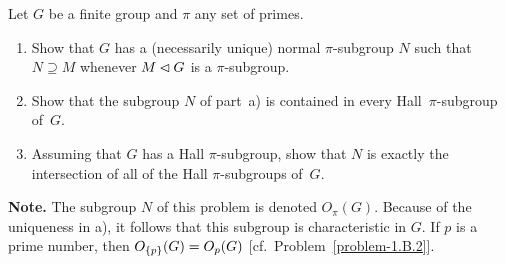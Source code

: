 \begin{probl}\label{problem-1.D.7} Let $G$ be a finite group and $\pi$ any set of primes.
    \begin{enumerate}[\rm a)]
    \item Show that $G$ has a (necessarily unique) normal\/ $\pi$-subgroup\/ $N$ such that $N \supseteq M$ whenever $M\lhd G$ is a $\pi$-subgroup.

    \item Show that the subgroup\/ $N$ of part\/~{\rm a)} is contained in every Hall\/~$\pi$-subgroup of\/~$G$.

    \item Assuming that $G$ has a Hall\/ $\pi$-subgroup, show that $N$ is exactly the intersection of all of the Hall\/ $\pi$-subgroups of\/~$G$.
    \end{enumerate}

    \textrm{\rm {\bf Note.} The subgroup $N$ of this problem is denoted $O_\pi(G)$. Because of the uniqueness in a), it follows that this subgroup is characteristic in $G$. If $p$ is a prime number, then $O_{\{p\}}(G) = O_p(G)$ [cf.~Problem~\ref{problem-1.B.2}].}
\end{probl}

